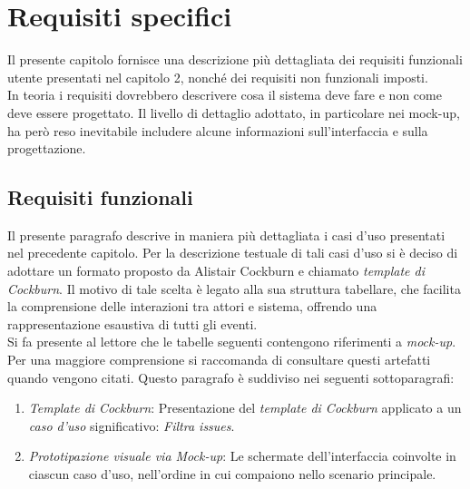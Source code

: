 \chapter{Requisiti specifici} %

\label{Chapter3} %



Il presente capitolo fornisce una descrizione più dettagliata dei requisiti funzionali 
utente presentati nel capitolo 2, nonché dei requisiti non funzionali imposti. \\
\indent In teoria i requisiti dovrebbero descrivere cosa il sistema deve fare e non come deve essere progettato. Il livello di dettaglio adottato, in particolare nei mock-up, ha però reso inevitabile includere alcune informazioni sull'interfaccia e sulla progettazione.

\section{Requisiti funzionali}

Il presente paragrafo descrive in maniera più dettagliata i casi d’uso presentati nel precedente capitolo. Per la descrizione testuale di tali casi d’uso si è deciso di adottare un formato proposto da Alistair Cockburn e chiamato \textit{template di Cockburn}. Il motivo di tale scelta è legato alla sua struttura tabellare, che facilita la comprensione
delle interazioni tra attori e sistema, offrendo una rappresentazione esaustiva di tutti
gli eventi. \\
\indent Si fa presente al lettore che le tabelle seguenti contengono riferimenti a \textit{mock-up}. Per una maggiore comprensione si raccomanda di consultare questi artefatti quando vengono citati. Questo paragrafo è suddiviso nei seguenti sottoparagrafi: \\

\begin{enumerate}
    \item \textit{Template di Cockburn}: Presentazione del \textit{template di Cockburn} applicato a un \textit{caso d'uso} significativo: \textit{Filtra issues}.
    \item \textit{Prototipazione visuale via Mock-up}: Le schermate dell'interfaccia coinvolte in ciascun caso d'uso, nell'ordine in cui compaiono nello scenario principale.
\end{enumerate}

